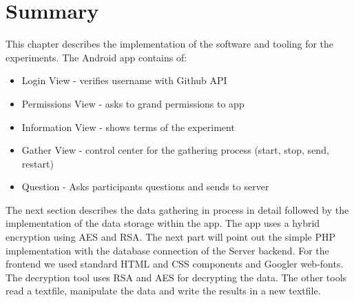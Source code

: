 \section{Summary}
This chapter describes the implementation of the software and tooling for the experiments. 
\bigbreak
The Android app contains of:
\begin{itemize}
\item Login View - verifies username with Github API
\item Permissions View - asks to grand permissions to app
\item Information View - shows terms of the experiment
\item Gather View - control center for the gathering process (start, stop, send, restart)
\item Question - Asks participants questions and sends to server
\end{itemize}
The next section describes the data gathering in process in detail followed by the implementation of the data storage within the app. The app uses a hybrid encryption using AES and RSA. 
\bigbreak
The next part will point out the simple PHP implementation with the database connection of the Server backend. For the frontend we used standard HTML and CSS components and Googler web-fonts.
The decryption tool uses RSA and AES for decrypting the data. The other tools read a textfile, manipulate the data and write the results in a new textfile.  
